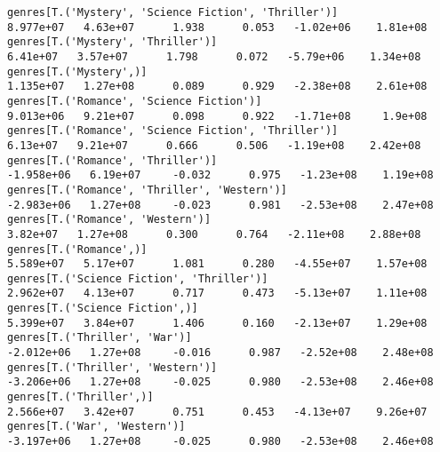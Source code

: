 \documentclass[11pt]{article}
\begin{document}
\begin{Verbatim}[commandchars=\\\{\}]
genres[T.('Mystery', 'Science Fiction', 'Thriller')]                                                          8.977e+07   4.63e+07      1.938      0.053   -1.02e+06    1.81e+08
genres[T.('Mystery', 'Thriller')]                                                                              6.41e+07   3.57e+07      1.798      0.072   -5.79e+06    1.34e+08
genres[T.('Mystery',)]                                                                                        1.135e+07   1.27e+08      0.089      0.929   -2.38e+08    2.61e+08
genres[T.('Romance', 'Science Fiction')]                                                                      9.013e+06   9.21e+07      0.098      0.922   -1.71e+08     1.9e+08
genres[T.('Romance', 'Science Fiction', 'Thriller')]                                                           6.13e+07   9.21e+07      0.666      0.506   -1.19e+08    2.42e+08
genres[T.('Romance', 'Thriller')]                                                                            -1.958e+06   6.19e+07     -0.032      0.975   -1.23e+08    1.19e+08
genres[T.('Romance', 'Thriller', 'Western')]                                                                 -2.983e+06   1.27e+08     -0.023      0.981   -2.53e+08    2.47e+08
genres[T.('Romance', 'Western')]                                                                               3.82e+07   1.27e+08      0.300      0.764   -2.11e+08    2.88e+08
genres[T.('Romance',)]                                                                                        5.589e+07   5.17e+07      1.081      0.280   -4.55e+07    1.57e+08
genres[T.('Science Fiction', 'Thriller')]                                                                     2.962e+07   4.13e+07      0.717      0.473   -5.13e+07    1.11e+08
genres[T.('Science Fiction',)]                                                                                5.399e+07   3.84e+07      1.406      0.160   -2.13e+07    1.29e+08
genres[T.('Thriller', 'War')]                                                                                -2.012e+06   1.27e+08     -0.016      0.987   -2.52e+08    2.48e+08
genres[T.('Thriller', 'Western')]                                                                            -3.206e+06   1.27e+08     -0.025      0.980   -2.53e+08    2.46e+08
genres[T.('Thriller',)]                                                                                       2.566e+07   3.42e+07      0.751      0.453   -4.13e+07    9.26e+07
genres[T.('War', 'Western')]                                                                                 -3.197e+06   1.27e+08     -0.025      0.980   -2.53e+08    2.46e+08

\end{Verbatim}
\end{document}
